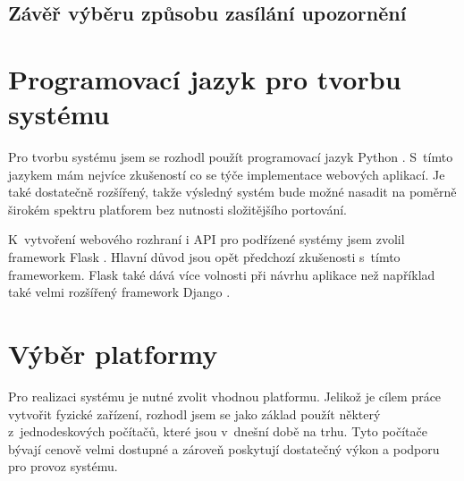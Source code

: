 


\subsection{Závěř výběru způsobu zasílání upozornění}




\section{Programovací jazyk pro tvorbu systému}
\label{sec:an_lang}

Pro tvorbu systému jsem se rozhodl použít programovací jazyk Python \cite{python_tutorial}. S~tímto jazykem mám nejvíce zkušeností co se týče implementace webových aplikací. Je také dostatečně rozšířený, takže výsledný systém bude možné nasadit na poměrně širokém spektru platforem bez nutnosti složitějšího portování.

K~vytvoření webového rozhraní i API pro podřízené systémy jsem zvolil framework Flask \cite{flask_about}. Hlavní důvod jsou opět předchozí zkušenosti s~tímto frameworkem. Flask také dává více volnosti při návrhu aplikace než například také velmi rozšířený framework Django \cite{django_about}.

\section{Výběr platformy}
\label{sec:an_plat}

Pro realizaci systému je nutné zvolit vhodnou platformu. Jelikož je cílem práce vytvořit fyzické zařízení, rozhodl jsem se jako základ použít některý z~jednodeskových počítačů, které jsou v~dnešní době na trhu. Tyto počítače bývají cenově velmi dostupné a zároveň poskytují dostatečný výkon a podporu pro provoz systému.

